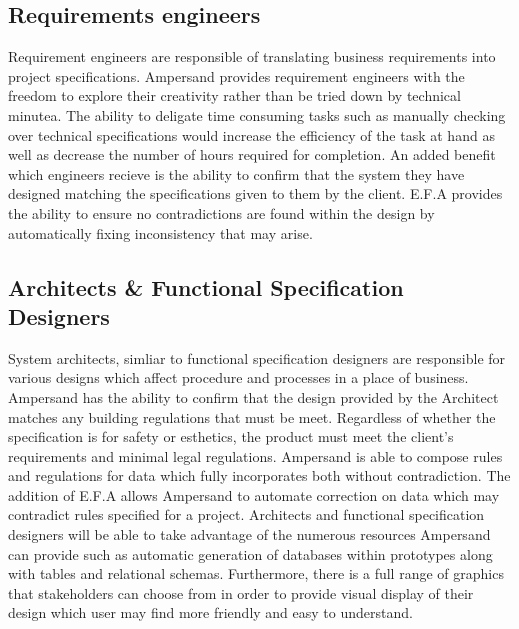 \documentclass[12pt]{report}
\begin{document}
\subsection{Requirements engineers}\label{subsec:BusReq}
Requirement engineers are responsible of translating business 
requirements into project specifications. Ampersand provides requirement 
engineers with the freedom to explore their creativity rather than be tried 
down by technical minutea. The ability to deligate time consuming tasks such as 
manually checking over technical specifications would increase the efficiency 
of the task at hand as well as decrease the number of hours required for 
completion. An added benefit which engineers recieve is the ability to confirm 
that the system they have designed matching the specifications given to them by 
the client. E.F.A provides the ability to ensure no contradictions are found 
within the design by automatically fixing inconsistency that may arise. 
\subsection{Architects \& Functional Specification Designers}
System architects, simliar to functional specification designers are 
responsible for various designs which affect procedure and processes in a place 
of business. Ampersand has the ability to confirm that the design provided by 
the Architect matches any building regulations that must be meet. Regardless of 
whether the specification is for safety or esthetics, the product must meet the 
client's requirements and minimal legal regulations. Ampersand is able to 
compose rules and regulations for data which fully incorporates both without 
contradiction. The addition of E.F.A allows Ampersand to automate correction  
on data which may contradict rules specified for a project. Architects and 
functional specification designers will be able to take advantage of the 
numerous resources Ampersand can provide such as automatic generation of 
databases within prototypes along with tables and relational schemas. 
Furthermore, there is a full range of graphics that stakeholders can choose 
from in order to provide visual display of their design which user may find 
more friendly and easy to understand. 
\end{document}

